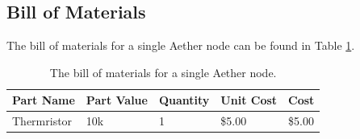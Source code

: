 \subsection{Bill of Materials}
The bill of materials for a single Aether node can be found in Table \ref{tab:bom}.

\begin{table}
\centering\scriptsize
\caption{The bill of materials for a single Aether node.}
\begin{tabular}{|l|l|l|l|l|}
\hline
Part Name & Part Value & Quantity & Unit Cost & Cost \\ 
\hline\hline
Thermristor & 10k & 1 & \$5.00 & \$5.00 \\\hline

\end{tabular}
\label{tab:bom}
\end{table}




